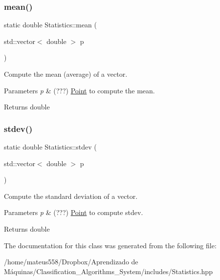 \subsubsection{\texorpdfstring{mean()}{mean()}}
{\footnotesize\ttfamily static double Statistics\+::mean (\begin{DoxyParamCaption}\item[{std\+::vector$<$ double $>$}]{p }\end{DoxyParamCaption})\hspace{0.3cm}{\ttfamily [static]}}



Compute the mean (average) of a vector. 


\begin{DoxyParams}{Parameters}
{\em p} & (???) \hyperlink{class_point}{Point} to compute the mean. \\
\hline
\end{DoxyParams}
\begin{DoxyReturn}{Returns}
double 
\end{DoxyReturn}
\mbox{\label{class_statistics_a4c1ba6a34efe8686419edd83e7c6d579}} 
\subsubsection{\texorpdfstring{stdev()}{stdev()}}
{\footnotesize\ttfamily static double Statistics\+::stdev (\begin{DoxyParamCaption}\item[{std\+::vector$<$ double $>$}]{p }\end{DoxyParamCaption})\hspace{0.3cm}{\ttfamily [static]}}



Compute the standard deviation of a vector. 


\begin{DoxyParams}{Parameters}
{\em p} & (???) \hyperlink{class_point}{Point} to compute stdev. \\
\hline
\end{DoxyParams}
\begin{DoxyReturn}{Returns}
double 
\end{DoxyReturn}


The documentation for this class was generated from the following file\+:\begin{DoxyCompactItemize}
\item 
/home/mateus558/\+Dropbox/\+Aprendizado de Máquinas/\+Classification\+\_\+\+Algorithms\+\_\+\+System/includes/Statistics.\+hpp\end{DoxyCompactItemize}

